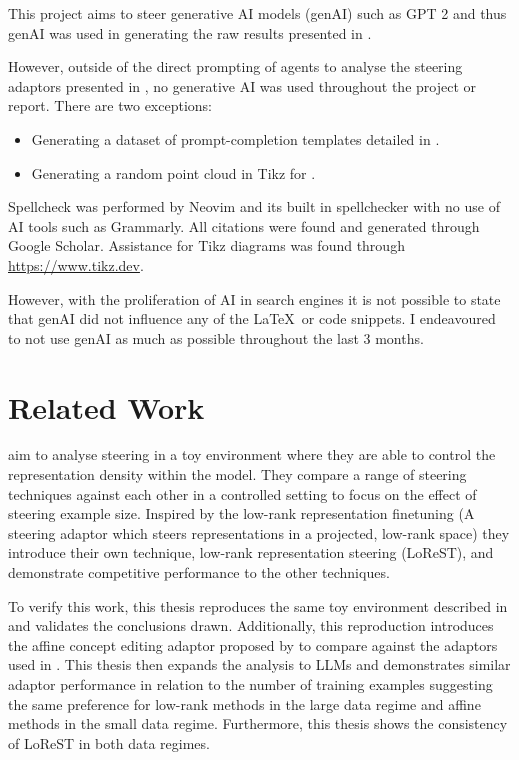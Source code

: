 This project aims to steer generative AI models (genAI) such as GPT 2 \citep{gpt-2} and thus genAI was used in generating the raw results presented in .

However, outside of the direct prompting of agents to analyse the steering adaptors presented in , no generative AI was used throughout the project or report.
There are two exceptions:
\begin{itemize}[nolistsep]
    \item Generating a dataset of prompt-completion templates detailed in .
    \item Generating a random point cloud in Tikz for .
\end{itemize}

Spellcheck was performed by Neovim and its built in spellchecker with no use of AI tools such as Grammarly.
All citations were found and generated through Google Scholar.
Assistance for Tikz diagrams was found through \href{https://www.tikz.dev}{https://www.tikz.dev}.

However, with the proliferation of AI in search engines it is not possible to state that genAI did not influence any of the \LaTeX~or code snippets.
I endeavoured to not use genAI as much as possible throughout the last 3 months.

\section{Related Work}

aim to analyse steering in a toy environment where they are able to control the representation density within the model.
They compare a range of steering techniques \citep{caa, reft, mimic} against each other in a controlled setting to focus on the effect of steering example size.
Inspired by the low-rank representation finetuning \citep[LoReFT]{reft} (A steering adaptor which steers representations in a projected, low-rank space) they introduce their own technique, low-rank representation steering (LoReST), and demonstrate competitive performance to the other techniques.

To verify this work, this thesis reproduces the same toy environment described in  and validates the conclusions drawn.
Additionally, this reproduction introduces the affine concept editing adaptor proposed by \citet{ace} to compare against the adaptors used in \citet{steering-clear}.
This thesis then expands the analysis to LLMs and demonstrates similar adaptor performance in relation to the number of training examples suggesting the same preference for low-rank methods in the large data regime and affine methods in the small data regime.
Furthermore, this thesis shows the consistency of LoReST in both data regimes.

